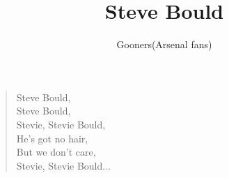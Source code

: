\documentclass[a4paper,12pt]{article}
\title{Steve Bould}
\author{Gooners(Arsenal fans)}
\date{}
\begin{document}
	
	\maketitle
	
	\begin{verse}
		
		Steve Bould, \\
		Steve Bould, \\
		Stevie, Stevie Bould, \\
		He's got no hair, \\
		But we don't care, \\
		Stevie, Stevie Bould$\ldots$
		
	\end{verse}
	
\end{document}
